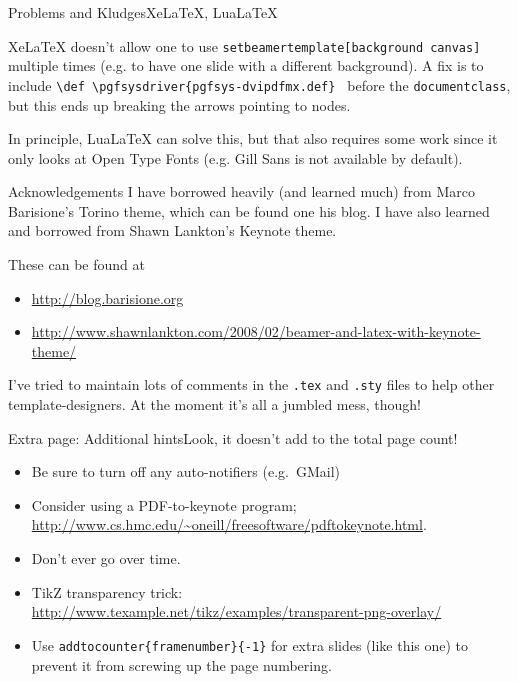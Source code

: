 \begin{frame}[c]{Problems and Kludges}{XeLaTeX, LuaLaTeX}
	 
	XeLaTeX doesn't allow one to use \texttt{setbeamertemplate[background canvas]} multiple times (e.g. to have one slide with a different background). A fix is to include \texttt{\textbackslash def \textbackslash pgfsysdriver\{pgfsys-dvipdfmx.def\} } before the \texttt{documentclass}, but this ends up breaking the arrows pointing to nodes.
	
	In principle, LuaLaTeX can solve this, but that also requires some work since it only looks at Open Type Fonts (e.g. Gill Sans is not available by default).
	
\end{frame}



\begin{frame}[t]{Acknowledgements}
	I have borrowed heavily (and learned much) from Marco Barisione's \alert{Torino theme}, which can be found one his blog. I have also learned and borrowed from Shawn Lankton's Keynote theme. 
	
	\vspace{1em}
	These can be found at
	\begin{itemize}
		\item \url{http://blog.barisione.org}
		\item \footnotesize{\url{http://www.shawnlankton.com/2008/02/beamer-and-latex-with-keynote-theme/}}
	\end{itemize}
	
	\vspace{1em}
	I've tried to maintain lots of comments in the \texttt{.tex} and \texttt{.sty} files to help other template-designers. At the moment it's all a jumbled mess, though!
\end{frame}



\addtocounter{framenumber}{-1}
\begin{frame}[c]{Extra page: Additional hints}{Look, it doesn't add to the total page count!}
	\begin{itemize}
		\item Be sure to turn off any auto-notifiers (e.g.\ GMail)
		\item Consider using a PDF-to-keynote program; \url{http://www.cs.hmc.edu/~oneill/freesoftware/pdftokeynote.html}.
		\item Don't ever go over time.
		\item TikZ transparency trick: \url{http://www.texample.net/tikz/examples/transparent-png-overlay/}
		\item Use \alert{\texttt{addtocounter\{framenumber\}\{-1\}}} for extra slides (like this one) to prevent it from screwing up the page numbering.
	\end{itemize}
\end{frame}


